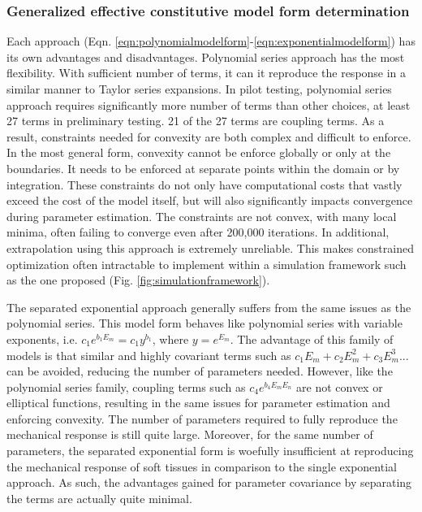 \subsubsection{Generalized effective constitutive model form determination} \label{sec:possibleforms}

	Each approach (Eqn. \ref{eqn:polynomialmodelform}-\ref{eqn:exponentialmodelform}) has its own advantages and disadvantages. Polynomial series approach has the most flexibility. With sufficient number of terms, it can it reproduce the response in a similar manner to Taylor series expansions. In pilot testing, polynomial series approach requires significantly more number of terms than other choices, at least 27 terms in preliminary testing. 21 of the 27 terms are coupling terms. As a result, constraints needed for convexity are both complex and difficult to enforce. In the most general form, convexity cannot be enforce globally or only at the boundaries. It needs to be enforced at separate points within the domain or by integration. These constraints do not only have computational costs that vastly exceed the cost of the model itself, but will also significantly impacts convergence during parameter estimation. The constraints are not convex, with many local minima, often failing to converge even after 200,000 iterations. In additional, extrapolation using this approach is extremely unreliable. This makes constrained optimization often intractable to implement within a simulation framework such as the one proposed (Fig. \ref{fig:simulationframework}).


	The separated exponential approach generally suffers from the same issues as the polynomial series. This model form behaves like polynomial series with variable exponents, i.e. $c_1e^{b_1E_m} = c_1y^{b_1}$, where $y =e^{E_m}$. The advantage of this family of models is that similar and highly covariant terms such as $c_1 E_m + c_2 E_m^2 + c_3 E_m^3 ...$ can be avoided, reducing the number of parameters needed. However, like the polynomial series family, coupling terms such as $c_4 e^{b_4 E_m E_n}$ are not convex or elliptical functions, resulting in the same issues for parameter estimation and enforcing convexity. The number of parameters required to fully reproduce the mechanical response is still quite large. Moreover, for the same number of parameters, the separated exponential form is woefully insufficient at reproducing the mechanical response of soft tissues in comparison to the single exponential approach. As such, the advantages gained for parameter covariance by separating the terms are actually quite minimal.
    
